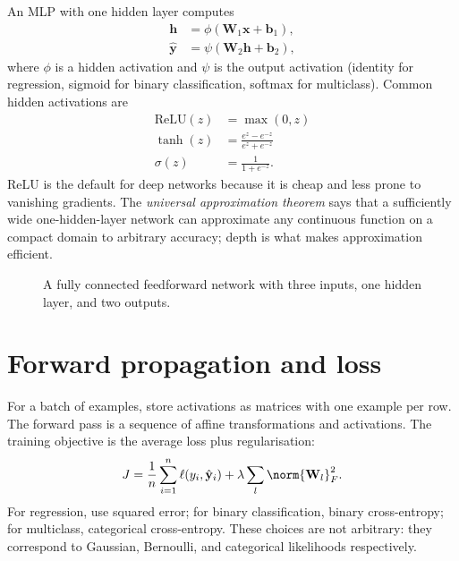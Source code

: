 \documentclass[a4paper, 12pt]{book}
\begin{document}
An MLP with one hidden layer computes
\begin{align}
    \mathbf{h} &= \phi(\mathbf{W}_1\mathbf{x}+\mathbf{b}_1),\\
    \hat{\mathbf{y}} &= \psi(\mathbf{W}_2\mathbf{h}+\mathbf{b}_2),
\end{align}
where $\phi$ is a hidden activation and $\psi$ is the output activation (identity for
regression, sigmoid for binary classification, softmax for multiclass). Common hidden
activations are
\begin{align}
    \mathrm{ReLU}(z) &= \max(0,z) \\
    \tanh(z) &= \frac{e^z-e^{-z}}{e^z+e^{-z}} \\
    \sigma(z) &= \frac{1}{1+e^{-z}}.
\end{align}
ReLU is the default for deep networks because it is cheap and less prone to vanishing
gradients. The \emph{universal approximation theorem} says that a sufficiently wide
one-hidden-layer network can approximate any continuous function on a compact domain
to arbitrary accuracy; depth is what makes approximation efficient.

\begin{figure}[htbp]
\centering
{}
\caption{A fully connected feedforward network with three inputs, one hidden layer,
and two outputs.}
\label{fig:mlp}
\end{figure}

\section{Forward propagation and loss}

For a batch of examples, store activations as matrices with one example per row. The
forward pass is a sequence of affine transformations and activations. The training
objective is the average loss plus regularisation:
\begin{align}
    J = \frac{1}{n}\sum_{i=1}^n \ell(y_i,\hat{\mathbf{y}}_i)
    + \lambda\sum_{l}\norm{\mathbf{W}_l}_F^2.
\end{align}
For regression, use squared error; for binary classification, binary cross-entropy;
for multiclass, categorical cross-entropy. These choices are not arbitrary: they
correspond to Gaussian, Bernoulli, and categorical likelihoods respectively.
\end{document}

